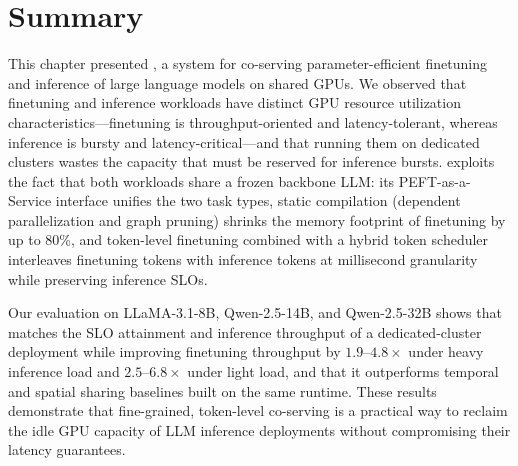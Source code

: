 \section{Summary}
\label{flexllm:sec:summary}
This chapter presented \FlexLLM, a system for co-serving parameter-efficient finetuning and inference of large language models on shared GPUs. We observed that finetuning and inference workloads have distinct GPU resource utilization characteristics---finetuning is throughput-oriented and latency-tolerant, whereas inference is bursty and latency-critical---and that running them on dedicated clusters wastes the capacity that must be reserved for inference bursts. \FlexLLM exploits the fact that both workloads share a frozen backbone LLM: its PEFT-as-a-Service interface unifies the two task types, static compilation (dependent parallelization and graph pruning) shrinks the memory footprint of finetuning by up to 80\%, and token-level finetuning combined with a hybrid token scheduler interleaves finetuning tokens with inference tokens at millisecond granularity while preserving inference SLOs.

Our evaluation on LLaMA-3.1-8B, Qwen-2.5-14B, and Qwen-2.5-32B shows that \FlexLLM matches the SLO attainment and inference throughput of a dedicated-cluster deployment while improving finetuning throughput by $1.9$--$4.8\times$ under heavy inference load and $2.5$--$6.8\times$ under light load, and that it outperforms temporal and spatial sharing baselines built on the same runtime. These results demonstrate that fine-grained, token-level co-serving is a practical way to reclaim the idle GPU capacity of LLM inference deployments without compromising their latency guarantees.

